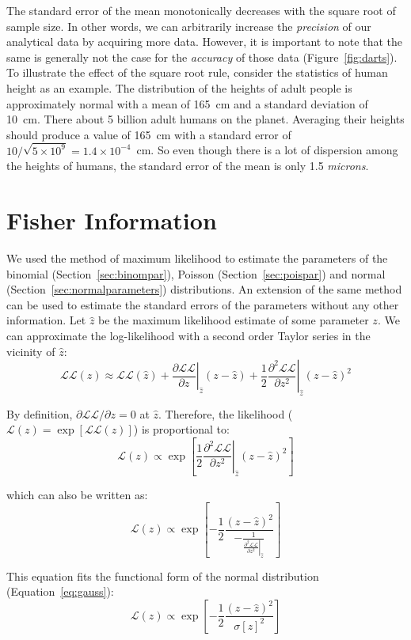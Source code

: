 The standard error of the mean monotonically decreases with the square
root of sample size. In other words, we can arbitrarily increase the
\emph{precision} of our analytical data by acquiring more
data. However, it is important to note that the same is generally not
the case for the \emph{accuracy} of those data
(Figure~\ref{fig:darts}). To illustrate the effect of the square root
rule, consider the statistics of human height as an example.  The
distribution of the heights of adult people is approximately normal
with a mean of 165~cm and a standard deviation of 10~cm. There about 5
billion adult humans on the planet. Averaging their heights should
produce a value of 165~cm with a standard error of
$10/\sqrt{5\times{10}^9} = 1.4\times{10}^{-4}$~cm. So even though
there is a lot of dispersion among the heights of humans, the standard
error of the mean is only 1.5 \emph{microns}.

\section{Fisher Information}
\label{sec:FisherInformation}

We used the method of maximum likelihood to estimate the parameters of
the binomial (Section~\ref{sec:binompar}), Poisson
(Section~\ref{sec:poispar}) and normal
(Section~\ref{sec:normalparameters}) distributions. An extension of
the same method can be used to estimate the standard errors of the
parameters without any other information. Let $\hat{z}$ be the maximum
likelihood estimate of some parameter $z$. We can approximate the
log-likelihood with a second order Taylor series in the vicinity of
$\hat{z}$:
\[
  \mathcal{LL}(z) \approx \mathcal{LL}(\hat{z}) +
  \left.\frac{\partial\mathcal{LL}}{\partial{z}}\right|_{\hat{z}}
  \!(z-\hat{z}) +
  \left.\frac{1}{2} \frac{\partial^2\mathcal{LL}}{\partial{z^2}}\right|_{\hat{z}}
  \!(z-\hat{z})^2
\]

By definition, $\partial{\mathcal{LL}}/\partial{z}=0$ at
$\hat{z}$. Therefore, the likelihood ($\mathcal{L}(z) =
\exp[\mathcal{LL}(z)]$) is proportional to:
\[
\mathcal{L}(z) \propto 
\exp\left[
  \frac{1}{2}
  \left.\frac{\partial^2\mathcal{LL}}{\partial{z^2}}\right|_{\hat{z}}
  \!(z-\hat{z})^2
  \right]
\]

\noindent which can also be written as:
\[
\mathcal{L}(z) \propto \exp\!\left[
  -\frac{1}{2} \frac{(z-\hat{z})^2}{
    -\frac{1}{\left.\frac{\partial^2\mathcal{LL}}{\partial{z^2}}\right|_{\hat{z}}}
  }\right]
\]

This equation fits the functional form of the normal distribution
(Equation~\ref{eq:gauss}):
\[
\mathcal{L}(z) \propto \exp\!\left[
  -\frac{1}{2} \frac{(z-\hat{z})^2}{\sigma[z]^2}
  \right]
\]

